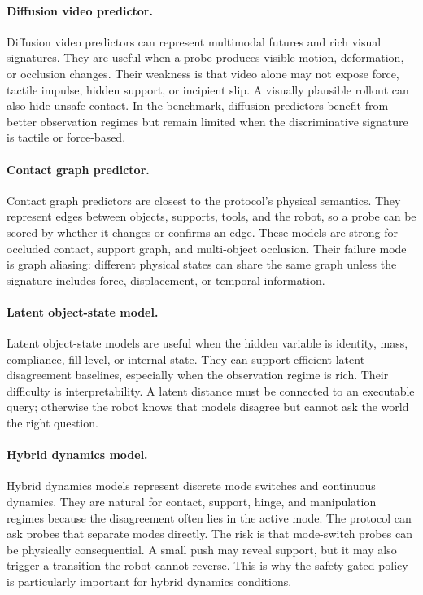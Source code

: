 \documentclass{article}
\begin{document}
\paragraph{Diffusion video predictor.}
Diffusion video predictors can represent multimodal futures and rich visual signatures. They are useful when a probe produces visible motion, deformation, or occlusion changes. Their weakness is that video alone may not expose force, tactile impulse, hidden support, or incipient slip. A visually plausible rollout can also hide unsafe contact. In the benchmark, diffusion predictors benefit from better observation regimes but remain limited when the discriminative signature is tactile or force-based.

\paragraph{Contact graph predictor.}
Contact graph predictors are closest to the protocol's physical semantics. They represent edges between objects, supports, tools, and the robot, so a probe can be scored by whether it changes or confirms an edge. These models are strong for occluded contact, support graph, and multi-object occlusion. Their failure mode is graph aliasing: different physical states can share the same graph unless the signature includes force, displacement, or temporal information.

\paragraph{Latent object-state model.}
Latent object-state models are useful when the hidden variable is identity, mass, compliance, fill level, or internal state. They can support efficient latent disagreement baselines, especially when the observation regime is rich. Their difficulty is interpretability. A latent distance must be connected to an executable query; otherwise the robot knows that models disagree but cannot ask the world the right question.

\paragraph{Hybrid dynamics model.}
Hybrid dynamics models represent discrete mode switches and continuous dynamics. They are natural for contact, support, hinge, and manipulation regimes because the disagreement often lies in the active mode. The protocol can ask probes that separate modes directly. The risk is that mode-switch probes can be physically consequential. A small push may reveal support, but it may also trigger a transition the robot cannot reverse. This is why the safety-gated policy is particularly important for hybrid dynamics conditions.
\end{document}
